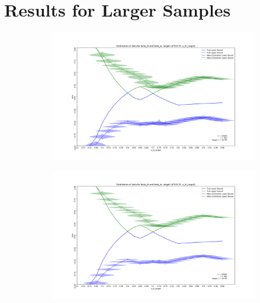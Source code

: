 \documentclass{article}
\begin{document}
\section{Results for Larger Samples}
\begin{figure}[h!]
    \caption{Simulation Results for Larger Sample Sizes \label{app_fig:large_n}}
     \centering

     \begin{subfigure}[b]{0.49\textwidth}
         \centering
          \includegraphics[width=\textwidth]{graph/simulation_sharp_bounds_25000_500_2e-05.png}
     \end{subfigure}
     \begin{subfigure}[b]{0.49\textwidth}
        \centering
        \includegraphics[width=\textwidth]{graph/simulation_sharp_bounds_50000_500_2e-05.png}
    \end{subfigure}
    

\end{figure}
\end{document}
